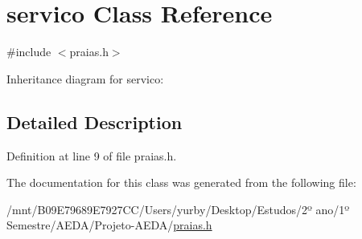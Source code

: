 \hypertarget{classservico}{}\section{servico Class Reference}
\label{classservico}


{\ttfamily \#include $<$praias.\+h$>$}



Inheritance diagram for servico\+:


\subsection{Detailed Description}


Definition at line 9 of file praias.\+h.



The documentation for this class was generated from the following file\+:\begin{DoxyCompactItemize}
\item 
/mnt/\+B09\+E79689\+E7927\+C\+C/\+Users/yurby/\+Desktop/\+Estudos/2º ano/1º Semestre/\+A\+E\+D\+A/\+Projeto-\/\+A\+E\+D\+A/\hyperlink{praias_8h}{praias.\+h}\end{DoxyCompactItemize}
